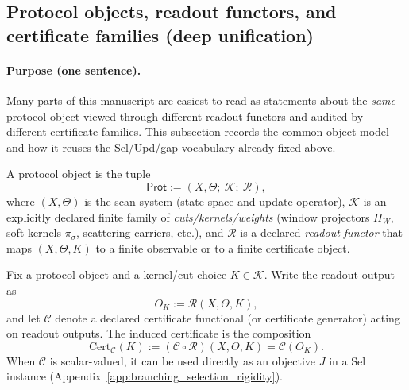 \subsection*{Protocol objects, readout functors, and certificate families (deep unification)}
\label{subsec:protocol_sampling_certificate_unification}

\paragraph{Purpose (one sentence).}
\AuditTag Many parts of this manuscript are easiest to read as statements about the \emph{same} protocol object viewed through different readout functors and audited by different certificate families.
This subsection records the common object model and how it reuses the Sel/Upd/gap vocabulary already fixed above.

\begin{definition}\label{def:protocol_object_packaging}
\AuditTag A protocol object is the tuple
\[
\mathsf{Prot}:=(X,\Theta;\ \mathcal{K};\ \mathcal{R}),
\]
where $(X,\Theta)$ is the scan system (state space and update operator),
$\mathcal{K}$ is an explicitly declared finite family of \emph{cuts/kernels/weights} (window projectors $\Pi_W$, soft kernels $\pi_\sigma$, scattering carriers, etc.),
and $\mathcal{R}$ is a declared \emph{readout functor} that maps $(X,\Theta,K)$ to a finite observable or to a finite certificate object.
\end{definition}

\begin{definition}\label{def:readout_certificate_composition}
\AuditTag Fix a protocol object and a kernel/cut choice $K\in\mathcal{K}$.
Write the readout output as
\[
O_K:=\mathcal{R}(X,\Theta,K),
\]
and let $\mathcal{C}$ denote a declared certificate functional (or certificate generator) acting on readout outputs.
The induced certificate is the composition
\[
\mathrm{Cert}_{\mathcal{C}}(K):=(\mathcal{C}\circ\mathcal{R})(X,\Theta,K)=\mathcal{C}(O_K).
\]
When $\mathcal{C}$ is scalar-valued, it can be used directly as an objective $J$ in a Sel instance (Appendix~\ref{app:branching_selection_rigidity}).
\end{definition}

